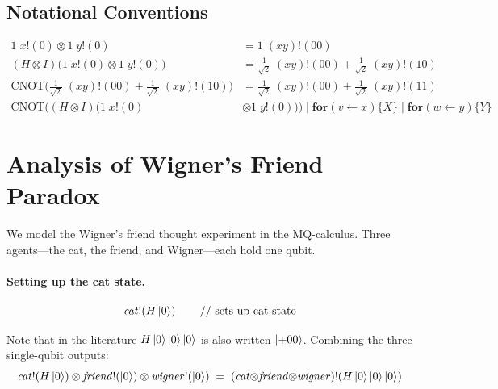\documentclass[11pt]{article}
\newcommand{\CNOT}{\mathrm{CNOT}}
\begin{document}
\subsection{Notational Conventions}

\begin{align*}
  1\; x!\!(0) \otimes 1\; y!\!(0)
    &= 1\; (xy)!\!(00) \\[6pt]
  (H \otimes I)\bigl(1\; x!\!(0) \otimes 1\; y!\!(0)\bigr)
    &= \tfrac{1}{\sqrt{2}}\; (xy)!\!(00)
     + \tfrac{1}{\sqrt{2}}\; (xy)!\!(10) \\[6pt]
  \CNOT\!\bigl(\tfrac{1}{\sqrt{2}}\; (xy)!\!(00)
     + \tfrac{1}{\sqrt{2}}\; (xy)!\!(10)\bigr)
    &= \tfrac{1}{\sqrt{2}}\; (xy)!\!(00)
     + \tfrac{1}{\sqrt{2}}\; (xy)!\!(11) \\[6pt]
  \CNOT\!\bigl((H \otimes I)\bigl(1\; x!\!(0)
     &\otimes 1\; y!\!(0)\bigr)\bigr)
    \;\Big|\;
    \mathbf{for}(v \leftarrow x)\{X\}
    \;\Big|\;
    \mathbf{for}(w \leftarrow y)\{Y\}
\end{align*}

\section{Analysis of Wigner's Friend Paradox}

We model the Wigner's friend thought experiment in the MQ-calculus.
Three agents---the cat, the friend, and Wigner---each hold one qubit.

\paragraph{Setting up the cat state.}
\begin{equation*}
  \mathit{cat}!\!\left(H\ket{0}\right)
  \qquad\text{// sets up cat state}
\end{equation*}

\noindent
Note that in the literature $H\ket{0}\ket{0}\ket{0}$ is also written
$\ket{+00}$.  Combining the three single-qubit outputs:
\begin{equation*}
  \mathit{cat}!\!\left(H\ket{0}\right)
  \otimes
  \mathit{friend}!\!\left(\ket{0}\right)
  \otimes
  \mathit{wigner}!\!\left(\ket{0}\right)
  \;=\;
  (\mathit{cat}{\otimes}\mathit{friend}{\otimes}\mathit{wigner})!\!\left(
    H\ket{0}\ket{0}\ket{0}
  \right)
\end{equation*}
\end{document}
